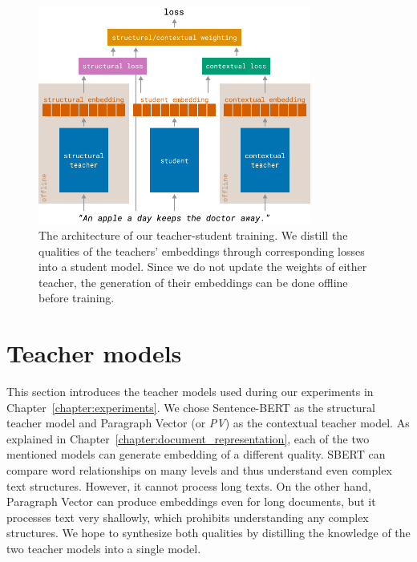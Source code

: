 \begin{figure}
  \centering
  \includegraphics[width=0.8\textwidth]{./img/training_architecture.pdf}

  \caption{The architecture of our teacher-student training. We distill the
  qualities of the teachers' embeddings through corresponding losses into a
  student model. Since we do not update the weights of either teacher,
  the generation of their embeddings can be done offline before training.}

  \label{fig:teacher_student_train_arch}

\end{figure}

\section{Teacher models}\label{section:teacher_models}

This section introduces the teacher models used during our experiments in
Chapter~\ref{chapter:experiments}. We chose Sentence-BERT
\citep{reimers2019sentence} as the structural teacher model and Paragraph
Vector \citep{le2014distributed} (or \emph{PV}) as the contextual teacher
model. As explained in Chapter~\ref{chapter:document_representation}, each of
the two mentioned models can generate embedding of a different quality. SBERT
can compare word relationships on many levels and thus understand even complex
text structures. However, it cannot process long texts. On the other hand,
Paragraph Vector can produce embeddings even for long documents, but it
processes text very shallowly, which prohibits understanding any complex
structures. We hope to synthesize both qualities by distilling the knowledge of
the two teacher models into a single model.

